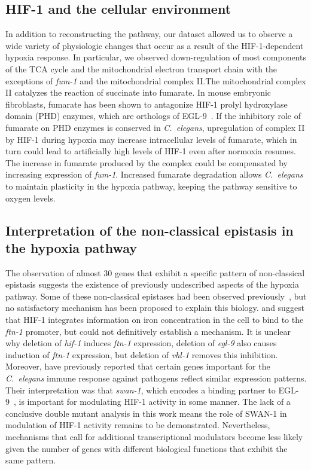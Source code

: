 \documentclass[10pt, onecolumn]{article}
\newcommand{\cel}{\emph{C.~elegans}}
\newcommand{\gene}[1]{\emph{#1}}
\newcommand{\ftna}{\emph{\mbox{ftn-1}}}
\newcommand{\eglp}{EGL-9}
\newcommand{\hifp}{HIF-1}
\begin{document}
\subsection*{\hifp{} and the cellular environment}

In addition to reconstructing the pathway, our dataset allowed us
to observe a wide variety of physiologic changes that occur as a result of the
\hifp{}-dependent hypoxia response. In particular, we observed down-regulation of most
components of the TCA cycle and the mitochondrial electron transport chain with
the exceptions of \gene{fum-1} and the mitochondrial complex II.\@ The mitochondrial
complex II catalyzes the reaction of succinate into fumarate.
In mouse embryonic fibroblasts, fumarate has been
shown to antagonize \hifp{} prolyl hydroxylase domain (PHD) enzymes, which are
orthologs of \eglp{}~\cite{Sudarshan2009}.
If the inhibitory role of fumarate on PHD enzymes is conserved in \cel{},
upregulation of complex II by \hifp{} during hypoxia may increase
intracellular levels of fumarate, which in turn could lead to artificially high
levels of \hifp{}
even after normoxia resumes. The increase in fumarate produced by the complex
could be compensated by increasing expression of \gene{fum-1}. Increased fumarate
degradation allows \cel{} to maintain plasticity in the hypoxia pathway, keeping
the pathway sensitive to oxygen levels.

\subsection*{Interpretation of the non-classical epistasis in the hypoxia pathway}
The observation of almost 30 genes that exhibit a specific pattern of non-classical
epistasis suggests the existence of previously undescribed aspects of the hypoxia
pathway. Some of these non-classical epistases had been observed
previously~\cite{Ackerman2012,Romney2011,Luhachack2012}, but
no satisfactory mechanism has been proposed to explain this biology.
\citep{Romney2011} and \citep{Ackerman2012}
suggest that \hifp{} integrates information on iron concentration in the
cell to bind to the \ftna{} promoter, but could not definitively establish
a mechanism.
It is unclear why deletion of \gene{hif-1} induces \ftna{}
expression, deletion of \gene{egl-9} also causes induction of \ftna{} expression,
but deletion of \gene{vhl-1} removes this inhibition. Moreover, \citep{Luhachack2012}
have previously reported that certain genes important for the \cel{} immune response
against pathogens reflect similar expression patterns. Their interpretation
was that \gene{swan-1}, which encodes a binding partner to \eglp{}~\cite{Shao2010},
is important for modulating \hifp{} activity in some manner. The lack of a
conclusive double mutant analysis in this work means the role of SWAN-1 in
modulation of \hifp{} activity remains to be demonstrated. Nevertheless, mechanisms
that call for additional transcriptional modulators become less likely given the
number of genes with different biological functions that exhibit the same pattern.
\end{document}

